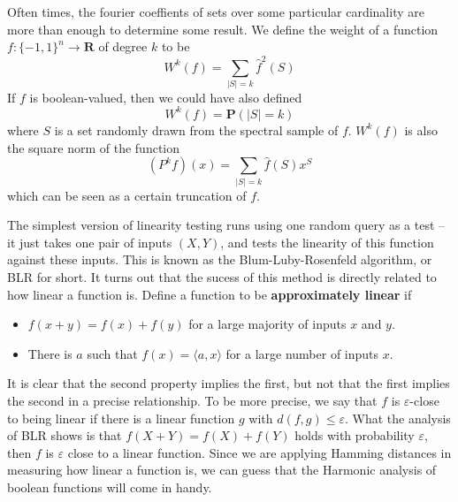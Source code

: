 Often times, the fourier coeffients of sets over some particular cardinality are more than enough to determine some result. We define the weight of a function $f: \{ -1, 1 \}^n \to \mathbf{R}$ of degree $k$ to be
%
\[ W^k(f) = \sum_{|S| = k} \widehat{f}^2(S) \]
%
If $f$ is boolean-valued, then we could have also defined
%
\[ W^k(f) = \mathbf{P}(|S| = k) \] 
%
where $S$ is a set randomly drawn from the spectral sample of $f$. $W^k(f)$ is also the square norm of the function
%
\[ (P^kf)(x) = \sum_{|S| = k} \widehat{f}(S) x^S \]
%
which can be seen as a certain truncation of $f$.

The simplest version of linearity testing runs using one random query as a test -- it just takes one pair of inputs $(X,Y)$, and tests the linearity of this function against these inputs. This is known as the Blum-Luby-Rosenfeld algorithm, or BLR for short. It turns out that the sucess of this method is directly related to how linear a function is. Define a function to be {\bf approximately linear} if
%
\begin{itemize}
    \item $f(x + y) = f(x) + f(y)$ for a large majority of inputs $x$ and $y$.
    \item There is $a$ such that $f(x) = \langle a, x \rangle$ for a large number of inputs $x$.
\end{itemize}
%
It is clear that the second property implies the first, but not that the first implies the second in a precise relationship. To be more precise, we say that $f$ is $\varepsilon$-close to being linear if there is a linear function $g$ with $d(f,g) \leq \varepsilon$. What the analysis of BLR shows is that $f(X + Y) = f(X) + f(Y)$ holds with probability $\varepsilon$, then $f$ is $\varepsilon$ close to a linear function. Since we are applying Hamming distances in measuring how linear a function is, we can guess that the Harmonic analysis of boolean functions will come in handy.

